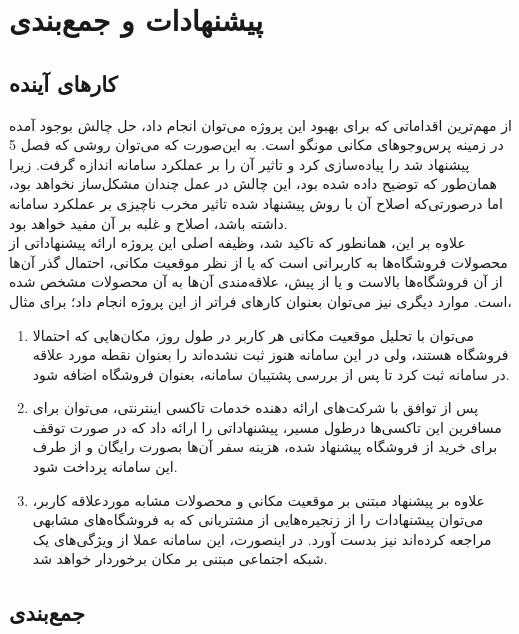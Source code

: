 \chapter{پیشنهادات و جمع‌بندی}

\section{کارهای آینده}

از مهم‌ترین اقداماتی که برای بهبود این پروژه می‌توان انجام داد، حل چالش بوجود آمده در زمینه پرس‌وجوهای مکانی مونگو است. به این‌صورت که می‌توان روشی که فصل 5 پیشنهاد شد را پیاده‌سازی کرد و تاثیر آن را بر عملکرد سامانه اندازه گرفت. زیرا همان‌طور که توضیح داده شده بود، این چالش در عمل چندان مشکل‌ساز نخواهد بود، اما درصورتی‌که اصلاح آن با روش پیشنهاد شده تاثیر مخرب ناچیزی بر عملکرد سامانه داشته باشد، اصلاح و غلبه بر آن مفید خواهد بود.\\

علاوه بر این، همانطور که تاکید شد، وظیفه اصلی این پروژه ارائه پیشنهاداتی از محصولات فروشگاه‌ها به کاربرانی است که یا از نظر موقعیت مکانی، احتمال گذر آن‌ها از آن فروشگاه‌ها بالاست و یا از پیش، علاقه‌مندی آن‌ها به آن محصولات مشخص شده است. موارد دیگری نیز می‌توان بعنوان کارهای فراتر از این پروژه انجام داد؛ برای مثال،

\begin{enumerate}

	\item می‌توان با تحلیل موقعیت مکانی هر کاربر در طول روز، مکان‌هایی که احتمالا فروشگاه هستند، ولی در این سامانه هنوز ثبت نشده‌اند را بعنوان نقطه مورد علاقه  در سامانه ثبت کرد تا پس از بررسی پشتیبان سامانه، بعنوان فروشگاه اضافه شود.
	\item پس از توافق با شرکت‌های ارائه دهنده خدمات تاکسی اینترنتی، می‌توان برای مسافرین این تاکسی‌ها درطول مسیر، پیشنهاداتی را ارائه داد که در صورت توقف برای خرید از فروشگاه پیشنهاد شده، هزینه سفر آن‌ها بصورت رایگان و از طرف این سامانه پرداخت شود.
	\item علاوه بر پیشنهاد مبتنی بر موقعیت مکانی و محصولات مشابه موردعلاقه کاربر، می‌توان پیشنهادات را از زنجیره‌هایی از مشتریانی که به فروشگاه‌های مشابهی مراجعه کرده‌اند نیز بدست آورد. در اینصورت، این سامانه عملا از ویژگی‌های یک شبکه اجتماعی مبتنی بر مکان برخوردار خواهد شد.
	
\end{enumerate}

\newpage

\section{جمع‌بندی}

